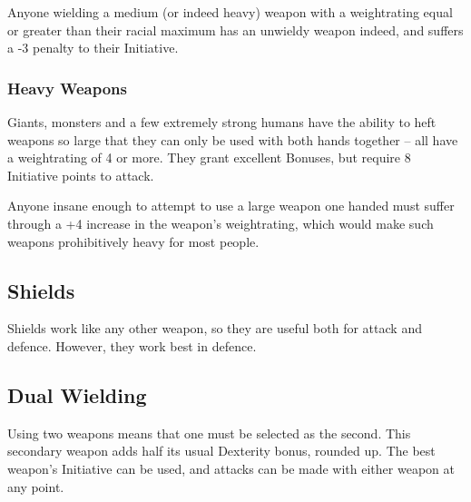 \begin{multicols}{2}
Anyone wielding a medium (or indeed heavy) weapon with a \gls{weightrating} equal or greater than their racial maximum has an unwieldy weapon indeed, and suffers a -3 penalty to their Initiative.

\subsubsection{Heavy Weapons}

Giants, monsters and a few extremely strong humans have the ability to heft weapons so large that they can only be used with both hands together -- all have a \gls{weightrating} of 4 or more.
They grant excellent Bonuses, but require 8 Initiative points to attack.

Anyone insane enough to attempt to use a large weapon one handed must suffer through a +4 increase in the weapon's \gls{weightrating}, which would make such weapons prohibitively heavy for most people.

\subsection{Shields}

Shields work like any other weapon, so they are useful both for attack and defence.
However, they work best in defence.

\subsection{Dual Wielding}

Using two weapons means that one must be selected as the second.
This secondary weapon adds half its usual Dexterity bonus, rounded up.
The best weapon's Initiative can be used, and attacks can be made with either weapon at any point.

\end{multicols}

\newcommand{\armourchart}{

	\begin{tcolorbox}[arc=1mm,tabularx={ccccc}]

	\textbf{Armour} & \textbf{\glsentrytext{dr}} & \textbf{Weight} & \textbf{Noise} & \textbf{Price} \\\hline

	Elvish & 2 & -1 & 0 & 3gp/ 9gp \\

	Padded & 2 & 2 & 0 & 1sp/ 3sp \\

	Leather & 3 & 1 & 1 & 5sp/ 15sp \\

	Chain & 4 &  2 & 3 & 10sp/ 30sp \\

	Plate & 5 &  3 & 4 & 12gp/ 36gp \\

	\end{tcolorbox}
}

